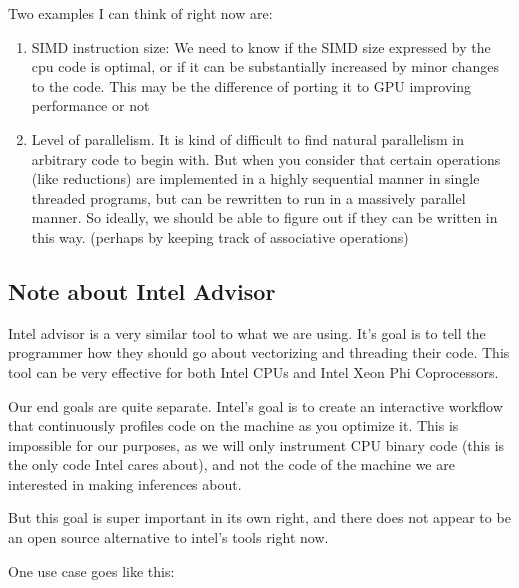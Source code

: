 \documentclass[12pt,twoside]{reedthesis}
\begin{document}
		Two examples I can think of right now are:

		\begin{enumerate}
			\item SIMD instruction size: We need to know if the SIMD size expressed by the cpu code is optimal, or if it can be substantially increased by minor changes to the code. This may be the difference of porting it to GPU improving performance or not

			\item Level of parallelism. It is kind of difficult to find natural parallelism in arbitrary code to begin with. But when you consider that certain operations (like reductions) are implemented in a highly sequential manner in single threaded programs, but can be rewritten to run in a massively parallel manner. So ideally, we should be able to figure out if they can be written in this way.  (perhaps by keeping track of associative operations)
		\end{enumerate}

		\subsection{Note about Intel\textsuperscript{\textregistered} Advisor}

		Intel advisor is a very similar tool to what we are using. It's goal is to tell the programmer how they should go about vectorizing and threading their code. This tool can be very effective for both Intel CPUs and Intel Xeon Phi Coprocessors.

		Our end goals are quite separate. Intel's goal is to create an interactive workflow that continuously profiles code on the machine as you optimize it. This is impossible for our purposes, as we will only instrument CPU binary code (this is the only code Intel cares about), and not the code of the machine we are interested in making inferences about.

		But this goal is super important in its own right, and there does not appear to be an open source alternative to intel's tools right now.

		One use case goes like this:
\end{document}
